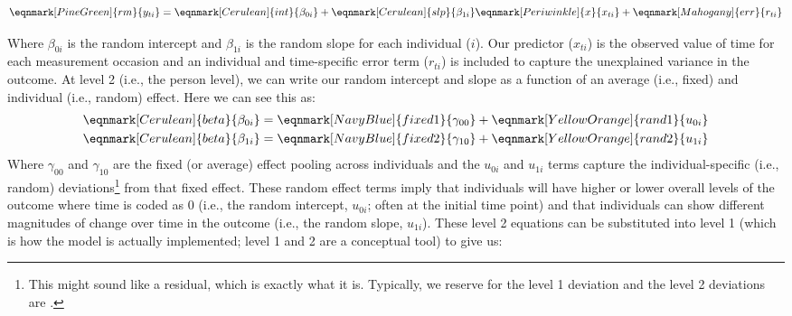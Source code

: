 \documentclass[11pt]{article}
\begin{document}
\begin{equation} \label{eq:1}
\eqnmark[PineGreen]{rm}{y_{ti}} = \eqnmark[Cerulean]{int}{\beta_{0i}} + \eqnmark[Cerulean]{slp}{\beta_{1i}}\eqnmark[Periwinkle]{x}{x_{ti}} + \eqnmark[Mahogany]{err}{r_{ti}}
\end{equation}
%

Where \textcolor{Cerulean}{$\beta_{0i}$} is the random intercept and $\beta_{1i}$ is the random slope for each individual ($i$). Our predictor ($x_{ti}$) is the observed value of time for each measurement occasion and an individual and time-specific error term ($r_{ti}$) is included to capture the unexplained variance in the outcome. At level 2 (i.e., the person level), we can write our random intercept and slope as a function of an average (i.e., fixed) and individual (i.e., random) effect. Here we can see this as:
%
\begin{equation} \label{eq:2}
\begin{split}
    & \eqnmark[Cerulean]{beta}{\beta_{0i}} = \eqnmark[NavyBlue]{fixed1}{\gamma_{00}} + \eqnmark[YellowOrange]{rand1}{u_{0i}} \\
    & \eqnmark[Cerulean]{beta}{\beta_{1i}} = \eqnmark[NavyBlue]{fixed2}{\gamma_{10}} + \eqnmark[YellowOrange]{rand2}{u_{1i}}
\end{split}
\end{equation}
%
Where $\gamma_{00}$ and $\gamma_{10}$ are the fixed (or average) effect pooling across individuals and the $u_{0i}$ and $u_{1i}$ terms capture the individual-specific (i.e., random) deviations\footnote{This might sound like a residual, which is exactly what it is. Typically, we reserve  for the level 1 deviation and the level 2 deviations are .} from that fixed effect. These random effect terms imply that individuals will have higher or lower overall levels of the outcome where time is coded as 0 (i.e., the random intercept, $u_{0i}$; often at the initial time point) and that individuals can show different magnitudes of change over time in the outcome (i.e., the random slope, $u_{1i}$). These level 2 equations can be substituted into level 1 (which is how the model is actually implemented; level 1 and 2 are a conceptual tool) to give us:
\end{document}

